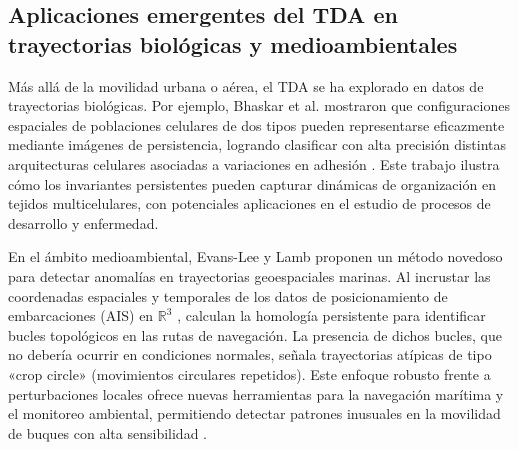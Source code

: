 \subsection{Aplicaciones emergentes del TDA en trayectorias biológicas y medioambientales}
Más allá de la movilidad urbana o aérea, el TDA se ha explorado en datos de trayectorias biológicas. Por ejemplo, Bhaskar et al. mostraron que configuraciones espaciales de poblaciones celulares de dos tipos pueden representarse eficazmente mediante imágenes de persistencia, logrando clasificar con alta precisión distintas arquitecturas celulares asociadas a variaciones en adhesión \cite{Bhaskar2023}. Este trabajo ilustra cómo los invariantes persistentes pueden capturar dinámicas de organización en tejidos multicelulares, con potenciales aplicaciones en el estudio de procesos de desarrollo y enfermedad.

En el ámbito medioambiental, Evans-Lee y Lamb proponen un método novedoso para detectar anomalías en trayectorias geoespaciales marinas. Al incrustar las coordenadas espaciales y temporales de los datos de posicionamiento de embarcaciones (AIS) en $\mathbb{R}^3$
, calculan la homología persistente para identificar bucles topológicos en las rutas de navegación. La presencia de dichos bucles, que no debería ocurrir en condiciones normales, señala trayectorias atípicas de tipo «crop circle» (movimientos circulares repetidos). Este enfoque robusto frente a perturbaciones locales ofrece nuevas herramientas para la navegación marítima y el monitoreo ambiental, permitiendo detectar patrones inusuales en la movilidad de buques con alta sensibilidad \cite{EvansLee2024}.
